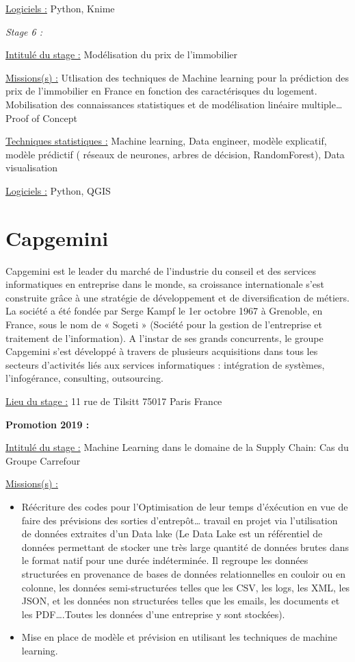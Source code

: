 \documentclass[
  letterpaper,
  DIV=11,
  numbers=noendperiod]{scrreprt}
\begin{document}
\uline{Logiciels :} Python, Knime

\emph{Stage 6 :}

\uline{Intitulé du stage :} Modélisation du prix de l'immobilier

\uline{Missions(s) :} Utlisation des techniques de Machine learning pour
la prédiction des prix de l'immobilier en France en fonction des
caractérisques du logement. Mobilisation des connaissances statistiques
et de modélisation linéaire multiple\ldots Proof of Concept

\uline{Techniques statistiques :} Machine learning, Data engineer,
modèle explicatif, modèle prédictif ( réseaux de neurones, arbres de
décision, RandomForest), Data visualisation

\uline{Logiciels :} Python, QGIS

\hypertarget{capgemini}{%
\section{\texorpdfstring{\textbf{Capgemini}}{Capgemini}}\label{capgemini}}

Capgemini est le leader du marché de l'industrie du conseil et des
services informatiques en entreprise dans le monde, sa croissance
internationale s'est construite grâce à une stratégie de développement
et de diversification de métiers. La société a été fondée par Serge
Kampf le 1er octobre 1967 à Grenoble, en France, sous le nom de « Sogeti
» (Société pour la gestion de l'entreprise et traitement de
l'information). A l'instar de ses grands concurrents, le groupe
Capgemini s'est développé à travers de plusieurs acquisitions dans tous
les secteurs d'activités liés aux services informatiques : intégration
de systèmes, l'infogérance, consulting, outsourcing.

\uline{Lieu du stage :} 11 rue de Tilsitt 75017 Paris France

\textbf{Promotion 2019 :}

\uline{Intitulé du stage :} Machine Learning dans le domaine de la
Supply Chain: Cas du Groupe Carrefour

\uline{Missions(s) :}

\begin{itemize}
\item
  Réécriture des codes pour l'Optimisation de leur temps d'éxécution en
  vue de faire des prévisions des sorties d'entrepôt\ldots{} travail en
  projet via l'utilisation de données extraites d'un Data lake (Le Data
  Lake est un référentiel de données permettant de stocker une très
  large quantité de données brutes dans le format natif pour une durée
  indéterminée. Il regroupe les données structurées en provenance de
  bases de données relationnelles en couloir ou en colonne, les données
  semi-structurées telles que les CSV, les logs, les XML, les JSON, et
  les données non structurées telles que les emails, les documents et
  les PDF\ldots.Toutes les données d'une entreprise y sont stockées).
\item
  Mise en place de modèle et prévision en utilisant les techniques de
  machine learning.
\end{itemize}
\end{document}
